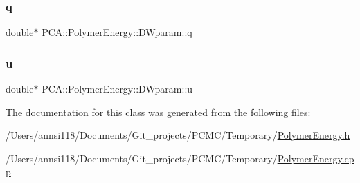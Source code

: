 \hypertarget{class_p_c_a_1_1_polymer_energy_1_1_d_wparam_aa81ddf89c6aeaeb56aa453206937fea0}{}\label{class_p_c_a_1_1_polymer_energy_1_1_d_wparam_aa81ddf89c6aeaeb56aa453206937fea0} 
\subsubsection{\texorpdfstring{q}{q}}
{\footnotesize\ttfamily double$\ast$ P\+C\+A\+::\+Polymer\+Energy\+::\+D\+Wparam\+::q}

\hypertarget{class_p_c_a_1_1_polymer_energy_1_1_d_wparam_af0c288045dda1bafb7bdea671a0cdf2a}{}\label{class_p_c_a_1_1_polymer_energy_1_1_d_wparam_af0c288045dda1bafb7bdea671a0cdf2a} 
\subsubsection{\texorpdfstring{u}{u}}
{\footnotesize\ttfamily double$\ast$ P\+C\+A\+::\+Polymer\+Energy\+::\+D\+Wparam\+::u}



The documentation for this class was generated from the following files\+:\begin{DoxyCompactItemize}
\item 
/\+Users/annsi118/\+Documents/\+Git\+\_\+projects/\+P\+C\+M\+C/\+Temporary/\hyperlink{_polymer_energy_8h}{Polymer\+Energy.\+h}\item 
/\+Users/annsi118/\+Documents/\+Git\+\_\+projects/\+P\+C\+M\+C/\+Temporary/\hyperlink{_polymer_energy_8cpp}{Polymer\+Energy.\+cpp}\end{DoxyCompactItemize}
